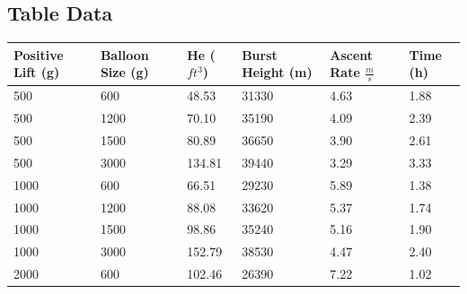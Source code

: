 \documentclass[english]{report}
\begin{document}
\begin{appendices}
  \chapter{Table Data}
  \begin{table}[]
  \centering
  \label{balloon_size}
  \begin{tabular}{@{}llllll@{}}
  \toprule
  \textbf{Positive Lift (g)} & \textbf{Balloon Size (g)} & \textbf{He ($ft^3$)} & \textbf{Burst Height (m)} & \textbf{Ascent Rate $\si{\frac{m}{s}}$} & \textbf{Time (h)} \\ \midrule
  \multicolumn{1}{|l|}{500} & \multicolumn{1}{l|}{600} & \multicolumn{1}{l|}{48.53} & \multicolumn{1}{l|}{31330} & \multicolumn{1}{l|}{4.63} & \multicolumn{1}{l|}{1.88} \\ \midrule
  \multicolumn{1}{|l|}{500} & \multicolumn{1}{l|}{1200} & \multicolumn{1}{l|}{70.10} & \multicolumn{1}{l|}{35190} & \multicolumn{1}{l|}{4.09} & \multicolumn{1}{l|}{2.39} \\ \midrule
  \multicolumn{1}{|l|}{500} & \multicolumn{1}{l|}{1500} & \multicolumn{1}{l|}{80.89} & \multicolumn{1}{l|}{36650} & \multicolumn{1}{l|}{3.90} & \multicolumn{1}{l|}{2.61} \\ \midrule
  \multicolumn{1}{|l|}{500} & \multicolumn{1}{l|}{3000} & \multicolumn{1}{l|}{134.81} & \multicolumn{1}{l|}{39440} & \multicolumn{1}{l|}{3.29} & \multicolumn{1}{l|}{3.33} \\ \midrule
  \multicolumn{1}{|l|}{1000} & \multicolumn{1}{l|}{600} & \multicolumn{1}{l|}{66.51} & \multicolumn{1}{l|}{29230} & \multicolumn{1}{l|}{5.89} & \multicolumn{1}{l|}{1.38} \\ \midrule
  \multicolumn{1}{|l|}{1000} & \multicolumn{1}{l|}{1200} & \multicolumn{1}{l|}{88.08} & \multicolumn{1}{l|}{33620} & \multicolumn{1}{l|}{5.37} & \multicolumn{1}{l|}{1.74} \\ \midrule
  \multicolumn{1}{|l|}{1000} & \multicolumn{1}{l|}{1500} & \multicolumn{1}{l|}{98.86} & \multicolumn{1}{l|}{35240} & \multicolumn{1}{l|}{5.16} & \multicolumn{1}{l|}{1.90} \\ \midrule
  \multicolumn{1}{|l|}{1000} & \multicolumn{1}{l|}{3000} & \multicolumn{1}{l|}{152.79} & \multicolumn{1}{l|}{38530} & \multicolumn{1}{l|}{4.47} & \multicolumn{1}{l|}{2.40} \\ \midrule
  \multicolumn{1}{|l|}{2000} & \multicolumn{1}{l|}{600} & \multicolumn{1}{l|}{102.46} & \multicolumn{1}{l|}{26390} & \multicolumn{1}{l|}{7.22} & \multicolumn{1}{l|}{1.02} \\ \midrule

\end{tabular}
\end{table}
\end{appendices}
\end{document}
